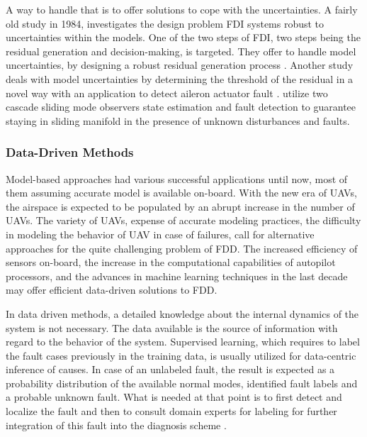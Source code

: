 A way to handle that is to offer solutions to cope with the uncertainties. 
A fairly old study in 1984, investigates the design problem FDI systems robust to 
uncertainties within the models. One of the two steps of FDI, two steps being the 
residual generation and decision-making, is targeted. They offer to handle model 
uncertainties, by designing a robust residual generation process \cite{chow1984analytical}. 
Another study deals with model uncertainties by determining the threshold of the residual 
in a novel way with an application to detect aileron actuator fault \cite{rotstein2006fault}. 
\cite{sharma2007fault} utilize two cascade sliding mode observers state estimation and 
fault detection to guarantee staying in sliding manifold in the presence of unknown 
disturbances and faults. 
%

\subsubsection{Data-Driven Methods}

Model-based approaches had various successful applications until now, 
most of them assuming accurate model is available on-board. With the new 
era of UAVs, the airspace is expected to be populated by an abrupt increase 
in the number of UAVs. The variety of UAVs, expense of accurate modeling 
practices, the difficulty in modeling the behavior of UAV in case of failures, 
call for alternative approaches for the quite challenging problem of FDD. 
The increased efficiency of sensors on-board, the increase in the computational 
capabilities of autopilot processors, and the advances in machine learning 
techniques in the last decade may offer efficient data-driven solutions to FDD.

In data driven methods, a detailed knowledge about the internal dynamics 
of the system is not necessary. The data available is the source of information 
with regard to the behavior of the system. Supervised learning, which requires 
to label the fault cases previously in the training data, is usually utilized for 
data-centric inference of causes. In case of an unlabeled fault, the result is 
expected as a probability distribution of the available normal modes, identified 
fault labels and a probable unknown fault. What is needed at that point is to 
first detect and localize the fault and then to consult domain experts for labeling 
for further integration of this fault into the diagnosis scheme \cite{dataCentricDiagOffline}.

